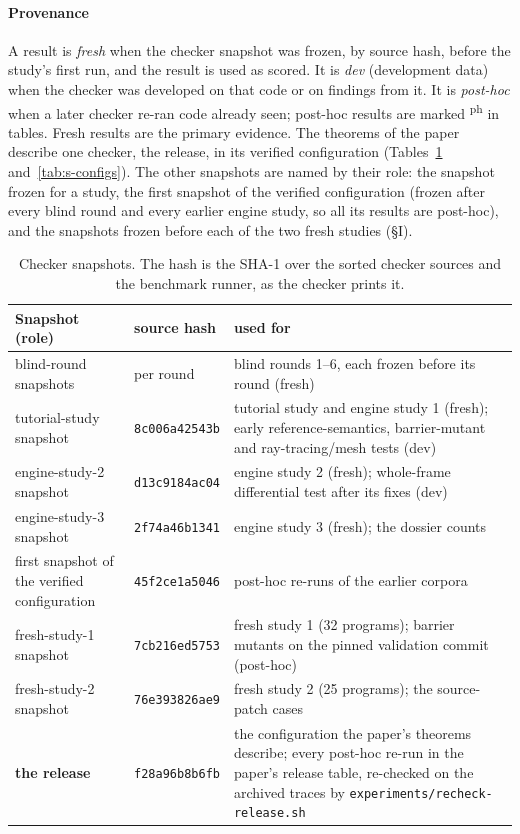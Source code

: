 \documentclass[acmtog,anonymous,review]{acmart}
\newcommand{\code}[1]{\texttt{#1}}
\newcommand{\posthoc}{\textsuperscript{\textsf{ph}}}
\newcommand{\relhash}{\code{f28a96b8b6fb}}
\begin{document}
\paragraph{Provenance}
A result is \emph{fresh} when the checker snapshot was frozen, by source hash, before the study's first run, and the
result is used as scored. It is \emph{dev} (development data) when the checker was developed on that code or on
findings from it. It is \emph{post-hoc} when a later checker re-ran code already seen; post-hoc results are marked
\posthoc{} in tables. Fresh results are the primary evidence. The theorems of the paper describe one checker, the
release, in its verified configuration (Tables~\ref{tab:s-versions} and~\ref{tab:s-configs}). The other snapshots are
named by their role: the snapshot frozen for a study, the first snapshot of the verified configuration (frozen after
every blind round and every earlier engine study, so all its results are post-hoc), and the snapshots frozen before
each of the two fresh studies (\S I).

\begin{table}[htbp]
\caption{Checker snapshots. The hash is the SHA-1 over the sorted checker sources and the benchmark runner, as the
checker prints it.}
\label{tab:s-versions}
\scriptsize
\begin{tabular}{@{}p{}p{}p{}@{}}
\toprule
Snapshot (role) & source hash & used for \\
\midrule
blind-round snapshots & per round & blind rounds 1--6, each frozen before its round (fresh) \\
tutorial-study snapshot & \code{8c006a42543b} & tutorial study and engine study 1 (fresh); early reference-semantics, barrier-mutant and ray-tracing/mesh tests (dev) \\
engine-study-2 snapshot & \code{d13c9184ac04} & engine study 2 (fresh); whole-frame differential test after its fixes (dev) \\
engine-study-3 snapshot & \code{2f74a46b1341} & engine study 3 (fresh); the dossier counts \\
first snapshot of the verified configuration & \code{45f2ce1a5046} & post-hoc re-runs of the earlier corpora \\
fresh-study-1 snapshot & \code{7cb216ed5753} & fresh study 1 (32 programs); barrier mutants on the pinned validation commit (post-hoc) \\
fresh-study-2 snapshot & \code{76e393826ae9} & fresh study 2 (25 programs); the source-patch cases \\
\textbf{the release} & \relhash & the configuration the paper's theorems describe; every post-hoc re-run in the paper's release table, re-checked on the archived traces by \code{experiments/recheck-release.sh} \\
\bottomrule
\end{tabular}
\end{table}
\end{document}
